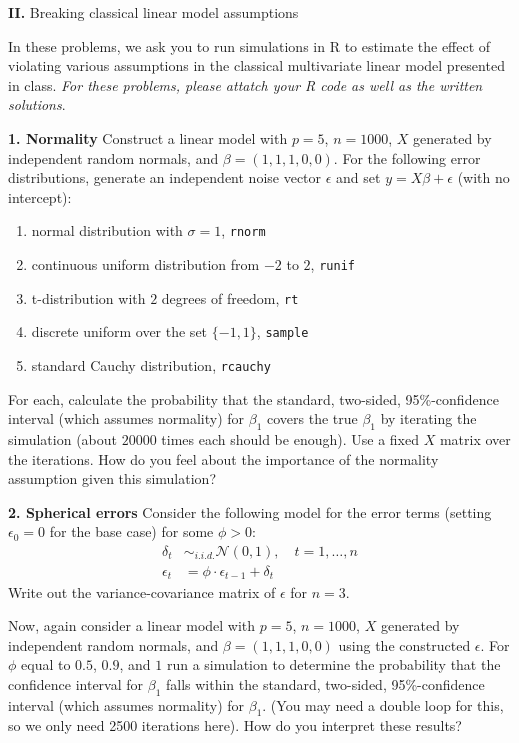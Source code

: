 \documentclass[12pt]{article}
\begin{document}
\newpage

{\bf II.} Breaking classical linear model assumptions

In these problems, we ask you to run simulations in R to estimate the effect of
violating various assumptions in the classical multivariate linear model presented
in class. {\it For these problems, please attatch your R code as well as the written
solutions}.

{\bf 1. Normality} Construct a linear model with $p=5$, $n=1000$,
$X$ generated by independent random normals, and $\beta = (1,1,1,0,0)$.
For the following error distributions, generate an independent noise
vector $\epsilon$ and set $y = X\beta + \epsilon$ (with no intercept):
\begin{enumerate}
\item normal distribution with $\sigma = 1$, \texttt{rnorm}
\item continuous uniform distribution from $-2$ to $2$, \texttt{runif}
\item t-distribution with $2$ degrees of freedom, \texttt{rt}
\item discrete uniform over the set $\{-1,1\}$, \texttt{sample}
\item standard Cauchy distribution, \texttt{rcauchy}
\end{enumerate}
For each, calculate the probability that the standard,
two-sided, 95\%-confidence interval (which assumes normality) for $\beta_1$
covers the true $\beta_1$ by iterating the simulation (about $20000$ times
each should be enough). Use a fixed $X$ matrix over the iterations.
How do you feel about the importance of the normality assumption given this simulation?

{\bf 2. Spherical errors} Consider the following model for the error terms
(setting $\epsilon_0 = 0$ for the base case) for some $\phi > 0$:
\begin{align}
\delta_t &\sim_{i.i.d.} \mathcal{N}(0,1), \quad t=1,\ldots,n \\
\epsilon_t &= \phi \cdot \epsilon_{t-1} + \delta_t
\end{align}
Write out the variance-covariance matrix of $\epsilon$ for $n=3$.

Now, again consider a linear model with $p=5$, $n=1000$,
$X$ generated by independent random normals, and $\beta = (1,1,1,0,0)$ using
the constructed $\epsilon$. For $\phi$ equal to $0.5$, $0.9$, and $1$ run
a simulation to determine the probability that the confidence
interval for $\beta_1$ falls within the standard,
two-sided, 95\%-confidence interval (which assumes normality) for $\beta_1$.
(You may need a double loop for this, so we only need 2500 iterations here).
How do you interpret these results?
\end{document}
